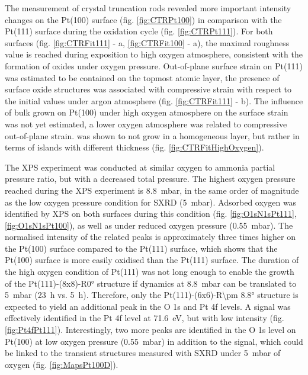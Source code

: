 The measurement of crystal truncation rods revealed more important intensity changes on the Pt(100) surface (fig. \ref{fig:CTRPt100}) in comparison with the Pt(111) surface during the oxidation cycle (fig. \ref{fig:CTRPt111}).
For both surfaces (fig. \ref{fig:CTRFit111} - a, \ref{fig:CTRFit100} - a), the maximal roughness value is reached during exposition to high oxygen atmosphere, consistent with the formation of oxides under oxygen pressure.
Out-of-plane surface strain on Pt(111) was estimated to be contained on the topmost atomic layer, the presence of surface oxide structures was associated with compressive strain with respect to the initial values under argon atmosphere (fig. \ref{fig:CTRFit111} - b).
The influence of bulk  grown on Pt(100) under high oxygen atmosphere on the surface strain was not yet estimated, a lower oxygen atmosphere was related to compressive out-of-plane strain.
 was shown to not grow in a homogeneous layer, but rather in terms of islands with different thickness (fig. \ref{fig:CTRFitHighOxygen}).

The XPS experiment was conducted at similar oxygen to ammonia partial pressure ratio, but with a decreased total pressure.
The highest oxygen pressure reached during the XPS experiment is \qty{8.8}{\milli\bar}, in the same order of magnitude as the low oxygen pressure condition for SXRD (\qty{5}{\milli\bar}).
Adsorbed oxygen was identified by XPS on both surfaces during this condition (fig. \ref{fig:O1sN1sPt111}, \ref{fig:O1sN1sPt100}), as well as under reduced oxygen pressure (\qty{0.55}{\milli\bar}).
The normalised intensity of the related peaks is approximately three times higher on the Pt(100) surface compared to the Pt(111) surface, which shows that the Pt(100) surface is more easily oxidised than the Pt(111) surface.
The duration of the high oxygen condition of Pt(111) was not long enough to enable the growth of the Pt(111)-(8x8)-R\ang{0} structure if dynamics at \qty{8.8}{\milli\bar} can be translated to \qty{5}{\milli\bar} (\qty{23}{\hour} vs. \qty{5}{\hour}).
Therefore, only the Pt(111)-(6x6)-R\ang{\pm 8.8} structure is expected to yield an additional peak in the O 1s and Pt 4f levels.
A signal was effectively identified in the Pt 4f level at \qty{71.6}{\eV}, but with low intensity (fig. \ref{fig:Pt4fPt111}).
Interestingly, two more peaks are identified in the O 1s level on Pt(100) at low oxygen pressure (\qty{0.55}{\milli\bar}) in addition to the  signal, which could be linked to the transient structures measured with SXRD under \qty{5}{\milli\bar} of oxygen (fig. \ref{fig:MapsPt100D}).

